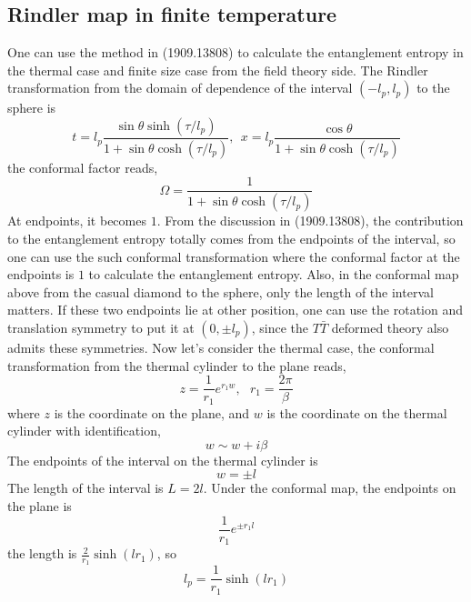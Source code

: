 \documentclass[11pt,a4paper]{article}
\begin{document}
\subsection{Rindler map in finite temperature}
	One can use the method in (1909.13808) to calculate the entanglement entropy in the thermal case and finite size case from the field theory side. The Rindler transformation from the domain of dependence of the interval $(-l_p,l_p)$ to the sphere is
	\begin{equation}
	t=l_p\frac{\sin\theta \sinh(\tau/l_p)}{1+\sin\theta \cosh(\tau/l_p)},\ \  x=l_p\frac{\cos\theta}{1+\sin\theta\cosh(\tau/l_p)}
	\end{equation}
	the conformal factor reads,
	\begin{equation}
	\Omega=\frac{1}{1+\sin\theta\cosh(\tau/l_p)}
	\end{equation}
	At endpoints, it becomes $1$. From the discussion in (1909.13808), the contribution to the entanglement entropy totally comes from the endpoints of the interval, so one can use the such conformal transformation where the conformal factor at the endpoints is $1$ to calculate the entanglement entropy. Also, in the conformal map above from the casual diamond to the sphere, only the length of the interval matters. If these two endpoints lie at other position, one can use the rotation and translation symmetry to put it at $(0,\pm l_p)$, since the $T\bar T$ deformed theory also admits these symmetries. Now let's consider the thermal case, the conformal transformation from the thermal cylinder to the plane reads,
	\begin{equation}
	z=\frac{1}{r_1}e^{r_1w},\ \ \ r_1=\frac{2\pi}{\beta}
	\end{equation} 
	where $z$ is the coordinate on the plane, and $w$ is the coordinate on the thermal cylinder with identification,
	\begin{equation}
	w\sim w+i\beta
	\end{equation}
	The endpoints of the interval on the thermal cylinder is
	\begin{equation}
	w=\pm l
	\end{equation} 
	The length of the interval is $L=2l$. Under the conformal map, the endpoints on the plane is
	\begin{equation}
	\frac{1}{r_1}e^{\pm r_1 l}
	\end{equation}
	the length is $\frac{2}{r_1}\sinh(l r_1)$, so
	\begin{equation}
	l_p=\frac{1}{r_1}\sinh(l r_1)
	\end{equation}
\end{document}

